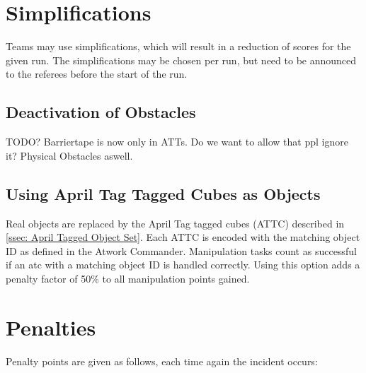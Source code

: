 \section{Simplifications}
Teams may use simplifications, which will result in a reduction of scores for the given run. The simplifications may be chosen per run, but need to be announced to the referees before the start of the run.

\subsection{Deactivation of Obstacles}

TODO?
Barriertape is now only in ATTs. Do we want to allow that ppl ignore it? Physical Obstacles aswell.

\subsection{Using April Tag Tagged Cubes as Objects}
Real objects are replaced by the April Tag tagged cubes (ATTC)  described in \ref{ssec: April Tagged Object Set}.
Each ATTC is encoded with the matching object ID as defined in the Atwork Commander.
Manipulation tasks count as successful if an atc with a matching object ID is handled correctly. Using this option adds a penalty factor of 50\% to all manipulation points gained.






\section{Penalties}
\label{sec:penalties}
Penalty points are given as follows, each time again the incident occurs:

